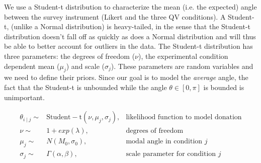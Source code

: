 


We use a Student-t distribution to characterize the mean (i.e. the expected) angle between the survey instrument (Likert and the three QV conditions). A Student-t, (unlike a Normal distribution) is heavy-tailed, in the sense that the Student-t distribution doesn't fall off as quickly as does a Normal distribution and will thus be able to better account for outliers in the data. The Student-t distribution has three parameters: the degrees of freedom ($\nu$), the experimental condition dependent mean ($\mu_j$) and scale ($\sigma_j$).  These parameters are random variables and we need to define their priors. Since our goal is to model the \textit{average} angle, the fact that the Student-t is unbounded while the angle $\theta \in [0, \pi]$ is bounded is unimportant.

\begin{align}
  \theta_{i \mid j} \sim & \mathrm{Student-t}(\nu, \mu_j, \sigma_j),   & \text{likelihood function to model donation} \label{eq:bayesian formulation} \\
  \nu \sim & 1 + exp(\lambda), & \text{degrees of freedom} \\
  \mu_j \sim & N(M_0, \sigma_0), & \text{modal angle in condition } j \\
  \sigma_j \sim & \Gamma(\alpha, \beta), & \text{scale parameter for condition } j
\end{align}
 
